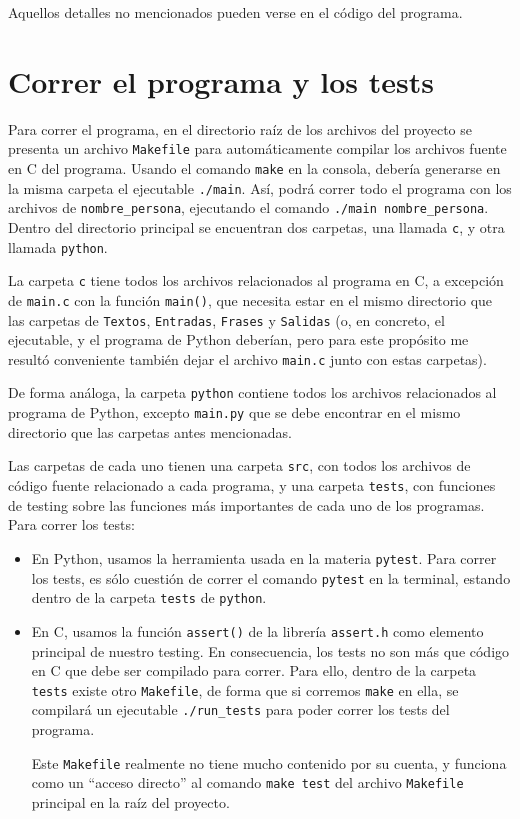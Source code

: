 \documentclass[a4paper]{article}
\begin{document}
Aquellos detalles no mencionados pueden verse en el código del programa.

\section{Correr el programa y los tests}

Para correr el programa, en el directorio raíz de los archivos del proyecto se presenta un archivo \texttt{Makefile} para automáticamente compilar los archivos fuente en C del programa. Usando el comando \texttt{make} en la consola, debería generarse en la misma carpeta el ejecutable \texttt{./main}. Así, podrá correr todo el programa con los archivos de \texttt{nombre\_persona}, ejecutando el comando \texttt{./main nombre\_persona}. \\

Dentro del directorio principal se encuentran dos carpetas, una llamada \texttt{c}, y otra llamada \texttt{python}. 

La carpeta \texttt{c} tiene todos los archivos relacionados al programa en C, a excepción de \texttt{main.c} con la función \texttt{main()}, que necesita estar en el mismo directorio que las carpetas de \texttt{Textos}, \texttt{Entradas}, \texttt{Frases} y \texttt{Salidas} (o, en concreto, el ejecutable, y el programa de Python deberían, pero para este propósito me resultó conveniente también dejar el archivo \texttt{main.c} junto con estas carpetas).

De forma análoga, la carpeta \texttt{python} contiene todos los archivos relacionados al programa de Python, excepto \texttt{main.py} que se debe encontrar en el mismo directorio que las carpetas antes mencionadas.

Las carpetas de cada uno tienen una carpeta \texttt{src}, con todos los archivos de código fuente relacionado a cada programa, y una carpeta \texttt{tests}, con funciones de testing sobre las funciones más importantes de cada uno de los programas. Para correr los tests:

\begin{itemize}
    \item En Python, usamos la herramienta usada en la materia \texttt{pytest}. Para correr los tests, es sólo cuestión de correr el comando \texttt{pytest} en la terminal, estando dentro de la carpeta \texttt{tests} de \texttt{python}.
    \item En C, usamos la función \texttt{assert()} de la librería \texttt{assert.h} como elemento principal de nuestro testing. En consecuencia, los tests no son más que código en C que debe ser compilado para correr. Para ello, dentro de la carpeta \texttt{tests} existe otro \texttt{Makefile}, de forma que si corremos \texttt{make} en ella, se compilará un ejecutable \texttt{./run\_tests} para poder correr los tests del programa.

        Este \texttt{Makefile} realmente no tiene mucho contenido por su cuenta, y funciona como un ``acceso directo'' al comando \texttt{make test} del archivo \texttt{Makefile} principal en la raíz del proyecto.
\end{itemize}
\end{document}
